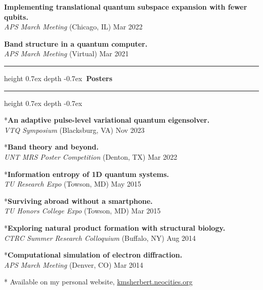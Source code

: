 \documentclass[marginmode, 10pt]{res} %
\def\Vhrulefill{\leavevmode\leaders\hrule height 0.7ex depth \dimexpr0.4pt-0.7ex\hfill\kern0pt}         %
\begin{document}
\begin{resume}
\textbf{Implementing translational quantum subspace expansion with fewer qubits.} \\
    \textit{APS March Meeting} (Chicago, IL) \hfill Mar 2022

\textbf{Band structure in a quantum computer.} \\
    \textit{APS March Meeting} (Virtual) \hfill Mar 2021

\Vhrulefill \textbf{~Posters~} \Vhrulefill


*\textbf{An adaptive pulse-level variational quantum eigensolver.} \\
    \textit{VTQ Symposium} (Blacksburg, VA) \hfill Nov 2023

*\textbf{Band theory and beyond.} \\
    \textit{UNT MRS Poster Competition} (Denton, TX) \hfill Mar 2022

*\textbf{Information entropy of 1D quantum systems.} \\
    \textit{TU Research Expo} (Towson, MD) \hfill May 2015

*\textbf{Surviving abroad without a smartphone.} \\
    \textit{TU Honors College Expo} (Towson, MD) \hfill Mar 2015

*\textbf{Exploring natural product formation with structural biology.} \\
    \textit{CTRC Summer Research Colloquium} (Buffalo, NY) \hfill Aug 2014

*\textbf{Computational simulation of electron diffraction.} \\
    \textit{APS March Meeting} (Denver, CO) \hfill Mar 2014

* Available on my personal website, \href{kmsherbert.neocities.org}{kmsherbert.neocities.org}


\end{resume}
\end{document}
